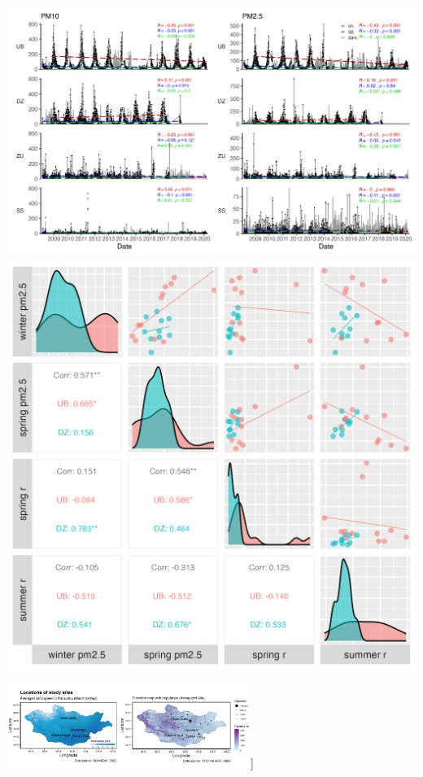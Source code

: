 \documentclass[
  11pt,
]{article}
\begin{document}
\includegraphics[width=6.25in,height=\textheight,keepaspectratio]{images/figure_8_supplement.png}
\includegraphics[width=6.25in,height=\textheight,keepaspectratio]{images/figure_9_supplement.png}

\newpage

\includegraphics[width=3.125in,height=\textheight,keepaspectratio]{images/figure_1.png}{]}
\end{document}
